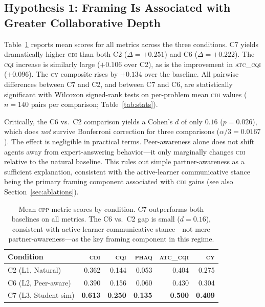 \documentclass{article}
\newcommand{\CDI}{\textsc{cdi}}
\newcommand{\CQI}{\textsc{cqi}}
\newcommand{\PhAQ}{\textsc{phaq}}
\newcommand{\ATC}{\textsc{atc\_cqi}}
\newcommand{\CY}{\textsc{cy}}
\newcommand{\CPP}{\textsc{cpp}}
\begin{document}
\subsection{Hypothesis 1: Framing Is Associated with Greater Collaborative Depth}

Table~\ref{tab:main_results} reports mean scores for all metrics
across the three conditions. C7 yields dramatically higher \CDI{} than
both C2 ($\Delta = +0.251$) and C6 ($\Delta = +0.222$). The \CQI{}
increase is similarly large ($+0.106$ over C2), as is the improvement
in \ATC{} ($+0.096$). The \CY{} composite rises by $+0.134$ over the
baseline. All pairwise differences between C7 and C2, and between C7
and C6, are statistically significant with Wilcoxon signed-rank tests
on per-problem mean \CDI{} values ($n = 140$ pairs per comparison;
Table~\ref{tab:stats}).

Critically, the C6 vs.\ C2 comparison yields a Cohen's $d$ of only
$0.16$ ($p = 0.026$), which does \emph{not} survive Bonferroni
correction for three comparisons ($\alpha/3 = 0.0167$). The effect is
negligible in practical terms. Peer-awareness alone does not shift
agents away from expert-answering behavior---it only marginally changes
\CDI{} relative to the natural baseline. This rules out simple partner-awareness as a sufficient explanation,
consistent with the active-learner communicative stance being the primary
framing component associated with \CDI{} gains (see also Section~\ref{sec:ablations}).

\begin{table}[t]
  \caption{Mean \CPP{} metric scores by condition. C7 outperforms both
  baselines on all metrics. The C6 vs.\ C2 gap is small ($d=0.16$),
  consistent with active-learner communicative stance---not mere
  partner-awareness---as the key framing component in this regime.}
  \label{tab:main_results}
  \centering
  \begin{tabular}{lrrrrr}
    \toprule
    \textbf{Condition} & \textbf{\CDI} & \textbf{\CQI} & \textbf{\PhAQ} & \textbf{\ATC} & \textbf{\CY} \\
    \midrule
    C2 (L1, Natural)   & 0.362 & 0.144 & 0.053 & 0.404 & 0.275 \\
    C6 (L2, Peer-aware) & 0.390 & 0.156 & 0.060 & 0.430 & 0.304 \\
    C7 (L3, Student-sim) & \textbf{0.613} & \textbf{0.250} & \textbf{0.135} & \textbf{0.500} & \textbf{0.409} \\
    \bottomrule
  \end{tabular}
\end{table}
\end{document}
